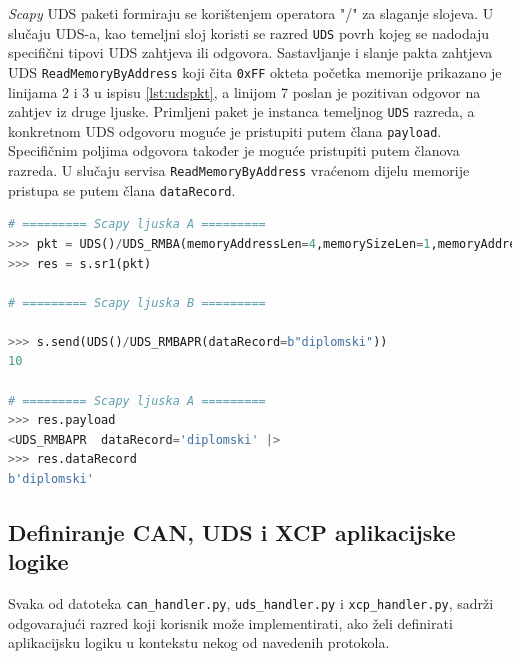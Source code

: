 \documentclass[times, utf8, diplomski, numeric]{fer}
\begin{document}
\textit{Scapy} UDS paketi formiraju se korištenjem operatora "/" za slaganje slojeva. U slučaju UDS-a, kao temeljni sloj koristi se razred \texttt{UDS} povrh kojeg se nadodaju specifični tipovi UDS zahtjeva ili odgovora. Sastavljanje i slanje pakta zahtjeva UDS \texttt{ReadMemoryByAddress} koji čita \texttt{0xFF} okteta početka memorije prikazano je linijama 2 i 3 u ispisu \ref{lst:udspkt}, a linijom 7 poslan je pozitivan odgovor na zahtjev iz druge ljuske. Primljeni paket je instanca temeljnog \texttt{UDS} razreda, a konkretnom UDS odgovoru moguće je pristupiti putem člana \texttt{payload}. Specifičnim poljima odgovora također je moguće pristupiti putem članova razreda. U slučaju servisa \texttt{ReadMemoryByAddress} vraćenom dijelu memorije pristupa se putem člana \texttt{dataRecord}.
\bigskip
\begin{lstlisting}[language=Python, label={lst:udspkt},caption={Sastavljane \textit{Scapy} paketa}]
# ========= Scapy ljuska A =========
>>> pkt = UDS()/UDS_RMBA(memoryAddressLen=4,memorySizeLen=1,memoryAddress4=0x0, memorySize1=0xFF)
>>> res = s.sr1(pkt)

# ========= Scapy ljuska B ========= 

>>> s.send(UDS()/UDS_RMBAPR(dataRecord=b"diplomski"))
10

# ========= Scapy ljuska A =========
>>> res.payload
<UDS_RMBAPR  dataRecord='diplomski' |>
>>> res.dataRecord
b'diplomski'

\end{lstlisting}

\subsection{Definiranje CAN, UDS i XCP aplikacijske logike}

Svaka od datoteka \texttt{can\_handler.py}, \texttt{uds\_handler.py} i \texttt{xcp\_handler.py}, sadrži odgovarajući razred  koji korisnik može implementirati, ako želi definirati aplikacijsku logiku u kontekstu nekog od navedenih protokola.
\end{document}
